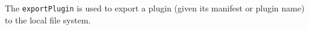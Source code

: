 The \verb+exportPlugin+ is used to export a plugin (given its manifest or plugin name) to the local file system.
